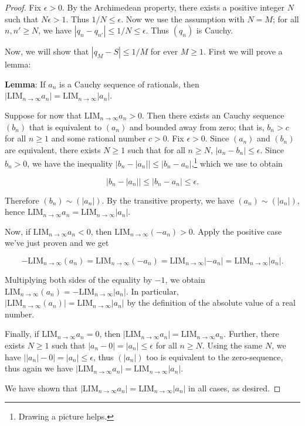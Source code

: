 \documentclass{article}
\newcommand{\ra}{\rightarrow}
\newcommand{\LIM}{{\mathrm{LIM}}}
\begin{document}
\begin{proof}
Fix $\epsilon > 0$. By the Archimedean property, there exists a positive integer $N$ such that $N\epsilon > 1$. Thus $1/N \leq \epsilon$. Now we use the assumption with $N=M$; for all $n, n' \geq N$, we have $|q_n - q_{n'}| \leq 1/N \leq \epsilon$. Thus $(q_n)$ is Cauchy.

Now, we will show that $|q_M - S | \leq 1/M$ for ever $M \geq 1$. First we will prove a lemma:

\textbf{Lemma}: If $a_n$ is a Cauchy sequence of rationals, then $| \LIM_{n \ra \infty} a_n | = \LIM_{n \ra \infty} |a_n|$.

Suppose for now that $\LIM_{n \ra \infty} a_n > 0$. Then there exists an Cauchy sequence $(b_n)$ that is equivalent to $(a_n)$ and bounded away from zero; that is, $b_n > c$ for all $n \geq 1$ and some rational number $c > 0$. Fix $\epsilon > 0$. Since $(a_n)$ and $(b_n)$ are equivalent, there exists $N \geq 1$ such that for all $n \geq N$, $|a_n - b_n | \leq \epsilon$. Since $b_n > 0$, we have the inequality $\big| b_n - |a_n| \big| \leq |b_n - a_n |$,\footnote{Drawing a picture helps.} which we use to obtain

\[ \big| b_n - |a_n| \big| \leq |b_n - a_n | \leq \epsilon. \]

Therefore $(b_n) \sim (|a_n|)$. By the transitive property, we have $(a_n) \sim (|a_n|)$, hence $\LIM_{n \ra \infty} a_n = \LIM_{n \ra \infty} |a_n|$.

Now, if $\LIM_{n \ra \infty} a_n < 0$, then $\LIM_{n \ra \infty} (-a_n) > 0$. Apply the positive case we've just proven and we get 

\[ - \LIM_{n \ra \infty} (a_n) = \LIM_{n \ra \infty} (-a_n) = \LIM_{n \ra \infty} |-a_n| = \LIM_{n \ra \infty} |a_n|. \]

Multiplying both sides of the equality by $-1$, we obtain $\LIM_{n \ra \infty} (a_n) = - \LIM_{n \ra \infty} |a_n|$. In particular, $| \LIM_{n \ra \infty} (a_n) | = \LIM_{n \ra \infty} |a_n|$ by the definition of the absolute value of a real number.

Finally, if $\LIM_{n \ra \infty} a_n = 0$, then $|\LIM_{n \ra \infty} a_n| = \LIM_{n \ra \infty} a_n$. Further, there exists $N \geq 1$ such that $|a_n - 0| = |a_n| \leq \epsilon$ for all $n \geq N$. Using the same $N$, we have $\big| |a_n| - 0 \big | = |a_n| \leq \epsilon$, thus $(|a_n|)$ too is equivalent to the zero-sequence, thus again we have $|\LIM_{n \ra \infty} a_n| = \LIM_{n \ra \infty} |a_n|$.

We have shown that $|\LIM_{n \ra \infty} a_n| = \LIM_{n \ra \infty} |a_n|$ in all cases, as desired.


\end{proof}
\end{document}
